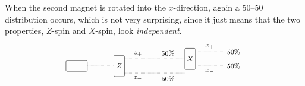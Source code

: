 When the second magnet is rotated into the $x$-direction, again a 50–50 distribution occurs, which is not very surprising, since it just means that the two properties, $Z$-spin and $X$-spin, look \emph{independent}.
\[
\begin{tikzpicture}[x=0.3cm, y=0.3cm, every node/.style={font=\footnotesize}]
  \def\sourceW{0.9}
  \def\sourceH{0.45}
  \def\deviceW{0.45}
  \def\deviceH{0.9}
  \def\branch{1}
  \def\rightSpan{4}
  \coordinate (xTwoBypass) at (15.25,-1);

  \node[draw, rounded corners=1.5pt, minimum width=\sourceW cm, minimum height=\sourceH cm] (source) at (0,0) {};
  \node[draw, rounded corners=1.5pt, minimum width=\deviceW cm, minimum height=\deviceH cm] (z1) at (6,0) {};
  \node[draw, rounded corners=1.5pt, minimum width=\deviceW cm, minimum height=\deviceH cm] (x2) at (16,1) {};

  \node at (z1) {$Z$};
  \node at (x2) {$X$};

  \draw[densely dotted] (source.east) -- (z1.west);
  \draw[densely dotted]
    (z1.east) ++(0,\branch)
    -- node[pos=0.22, anchor=south] {$z_{+}$}
       node[pos=0.72, anchor=south] {$50\%$}
    (x2.west);
  \draw[densely dotted]
    (z1.east) ++(0,-\branch)
    -- node[pos=0.22, anchor=north] {$z_{-}$}
       node[pos=0.72, anchor=north] {$50\%$}
    (xTwoBypass);

  \draw[densely dotted]
    (x2.east) ++(0,\branch)
    -- node[pos=0.5, anchor=south] {$x_{+}$}
       node[pos=1, anchor=west] {$50\%$}
    ++(\rightSpan,0);
  \draw[densely dotted]
    (x2.east) ++(0,-\branch)
    -- node[pos=0.5, anchor=north] {$x_{-}$}
       node[pos=1, anchor=west] {$50\%$}
    ++(\rightSpan,0);
\end{tikzpicture}
\]

